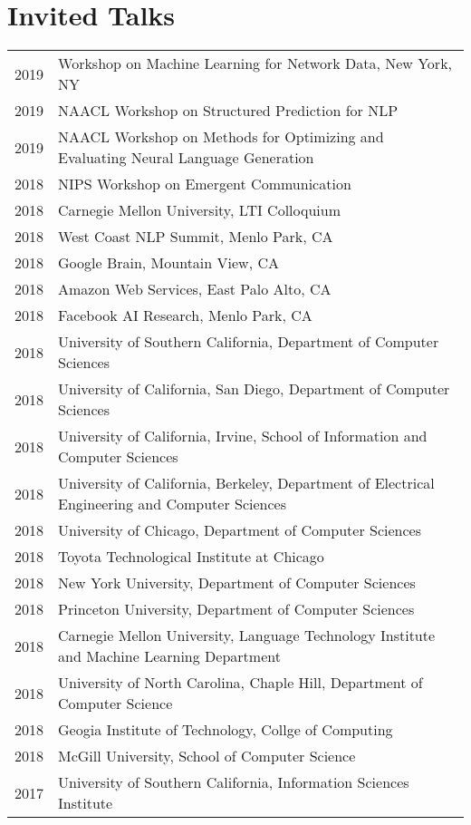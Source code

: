 \documentclass[a4paper,11pt]{article}
\begin{document}
\section{Invited Talks}
\begin{longtable}{rl}
    2019 & Workshop on Machine Learning for Network Data, New York, NY \\
    2019 & NAACL Workshop on Structured Prediction for NLP \\
    2019 & NAACL Workshop on Methods for Optimizing and Evaluating Neural Language Generation \\
    2018 & NIPS Workshop on Emergent Communication \\
    2018 & Carnegie Mellon University, LTI Colloquium \\
    2018 & West Coast NLP Summit, Menlo Park, CA \\
    2018 & Google Brain, Mountain View, CA \\
    2018 & Amazon Web Services, East Palo Alto, CA \\
    2018 & Facebook AI Research, Menlo Park, CA \\
    2018 & University of Southern California, Department of Computer Sciences \\
    2018 & University of California, San Diego, Department of Computer Sciences \\
    2018 & University of California, Irvine, School of Information and Computer Sciences \\
    2018 & University of California, Berkeley, Department of Electrical Engineering and Computer Sciences \\
    2018 & University of Chicago, Department of Computer Sciences \\
    2018 & Toyota Technological Institute at Chicago \\
    2018 & New York University, Department of Computer Sciences \\
    2018 & Princeton University, Department of Computer Sciences \\
    2018 & Carnegie Mellon University, Language Technology Institute and Machine Learning Department \\
    2018 & University of North Carolina, Chaple Hill, Department of Computer Science \\
    2018 & Geogia Institute of Technology, Collge of Computing \\
    2018 & McGill University, School of Computer Science \\
    2017 & University of Southern California, Information Sciences Institute \\

\end{longtable}
\end{document}

